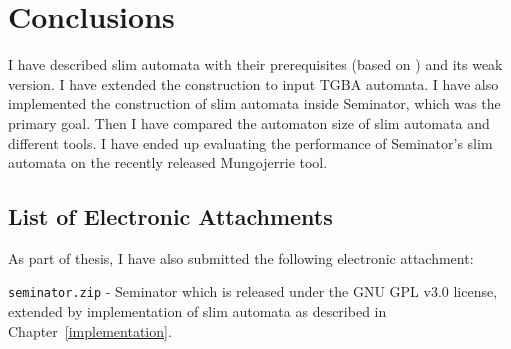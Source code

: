 \documentclass[
	digital,
nolof, nolot
]{fithesis3}
\begin{document}
	\chapter{Conclusions}
	
	I have described slim automata with their prerequisites (based on \cite{hlavni}) and its weak version.
	I have extended the construction to input TGBA automata.
	I have also implemented the construction of slim automata inside Seminator, which was the primary goal.
	Then I have compared the automaton size of slim automata and different tools.
	I have ended up evaluating the performance of Seminator's slim automata on the recently released Mungojerrie tool.
	
	\begin{appendices}
	
	\chapter{List of Electronic Attachments}
	As part of thesis, I have also submitted the following electronic attachment:
	
	\texttt{seminator.zip} - Seminator which is released under the GNU GPL v3.0 license, extended by implementation of slim automata as described in Chapter~\ref{implementation}.
	\end{appendices}
\end{document}
